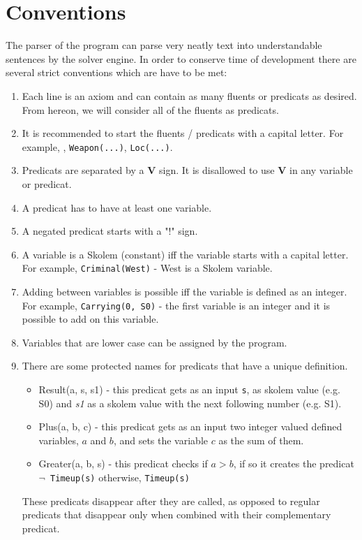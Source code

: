 \documentclass{article}                     %
\begin{document}
	\section{Conventions}
	The parser of the program can parse very neatly text into understandable sentences by the solver engine. In order to conserve time of development there are several strict conventions which are have to be met:
	\begin{enumerate}
		\item Each line is an axiom and can contain as many fluents or predicats as desired. From hereon, we will consider all of the fluents as predicats.
		\item It is recommended to start the fluents / predicats with a capital letter. For example, , \texttt{Weapon(...)}, \texttt{Loc(...)}.
		\item Predicats are separated by  a \textbf{V} sign. It is disallowed to use \textbf{V} in any variable or predicat.
		\item A predicat has to have at least one variable.
		\item A negated predicat starts with a "!" sign.
		\item A variable is a Skolem (constant) iff the variable starts with a capital letter. For example, \texttt{Criminal(West)} - West is a Skolem variable. 
		\item Adding between variables is possible iff the variable is defined as an integer. For example, \texttt{Carrying(0, S0)} - the first variable is an integer and it is possible to add on this variable.
		\item Variables that are lower case can be assigned by the program.
		\item There are some protected names for predicats that have a unique definition. 
			\begin{itemize}
				\item Result(a, s, s1) - this predicat gets as an input \texttt{s}, as skolem value (e.g. S0) and \textit{s1}  as a skolem value with the next following number (e.g. S1).
				\item Plus(a, b, c) - this predicat gets as an input two integer valued defined variables, $ a $ and $ b $, and sets the variable $ c $ as the sum of them.
				\item Greater(a, b, s) - this predicat checks if $ a > b $, if so it creates the predicat \texttt{$ \neg  $ Timeup(s)} otherwise, \texttt{Timeup(s)}
			\end{itemize}
		These predicats disappear after they are called, as opposed to regular predicats that disappear only when combined with their complementary predicat. 
	\end{enumerate}
\end{document}
